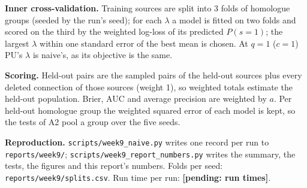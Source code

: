 \documentclass[conference]{IEEEtran}
\newcommand{\pending}[1]{\textbf{[pending: #1]}}
\providecommand{\RunTimes}{\pending{run times}}
\begin{document}
\textbf{Inner cross-validation.} Training sources are split into 3 folds of homologue groups (seeded by the run's seed); for each $\lambda$ a model is fitted on two folds and scored on the third by the weighted log-loss of its predicted $P(s=1)$; the largest $\lambda$ within one standard error of the best mean is chosen. At $q=1$ ($c=1$) PU's $\lambda$ is naive's, as its objective is the same.

\textbf{Scoring.} Held-out pairs are the sampled pairs of the held-out sources plus every deleted connection of those sources (weight 1), so weighted totals estimate the held-out population. Brier, AUC and average precision are weighted by $a$. Per held-out homologue group the weighted squared error of each model is kept, so the tests of A2 pool a group over the five seeds.

\textbf{Reproduction.} \texttt{scripts/week9\_naive.py} writes one record per run to \texttt{reports/week9/}; \texttt{scripts/week9\_report\_numbers.py} writes the summary, the tests, the figures and this report's numbers. Folds per seed: \texttt{reports/week9/splits.csv}. Run time per run: \RunTimes.
\end{document}
